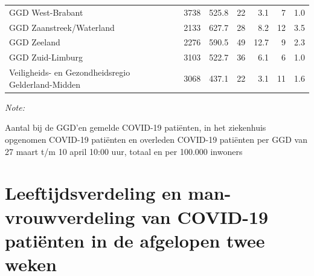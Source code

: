 \documentclass[
  english,
  man,floatsintext]{apa6}
\begin{document}
\begin{table}
\begin{threeparttable}
\begin{tabular}{lrrrrrr}
GGD West-Brabant & 3738 & 525.8 & 22 & 3.1 & 7 & 1.0\\
GGD Zaanstreek/Waterland & 2133 & 627.7 & 28 & 8.2 & 12 & 3.5\\
GGD Zeeland & 2276 & 590.5 & 49 & 12.7 & 9 & 2.3\\
GGD Zuid-Limburg & 3103 & 522.7 & 36 & 6.1 & 6 & 1.0\\
Veiligheids- en Gezondheidsregio Gelderland-Midden & 3068 & 437.1 & 22 & 3.1 & 11 & 1.6\\
\bottomrule
\end{tabular}
\begin{tablenotes}
\item \textit{Note: } 
\item Aantal bij de GGD’en gemelde COVID-19 patiënten, in het ziekenhuis opgenomen COVID-19 patiënten en overleden COVID-19 patiënten per GGD van 27 maart t/m 10 april 10:00 uur, totaal en per 100.000 inwoners
\end{tablenotes}
\end{threeparttable}
\endgroup{}
\end{table}

\newpage

\hypertarget{leeftijdsverdeling-en-man-vrouwverdeling-van-covid-19-patiuxebnten-in-de-afgelopen-twee-weken}{%
\section{Leeftijdsverdeling en man-vrouwverdeling van COVID-19 patiënten in de afgelopen twee weken}\label{leeftijdsverdeling-en-man-vrouwverdeling-van-covid-19-patiuxebnten-in-de-afgelopen-twee-weken}}
\end{document}

